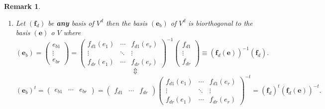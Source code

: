 \documentclass[aps,preprint]{revtex4}
\newtheorem{remark}[theorem]{Remark}
\begin{document}
\begin{remark}
\begin{enumerate}
\item Let $\left( \boldsymbol{f}_{d}\right) $ be \textbf{any} basis of $%
V^{d} $ then the basis $\left( \boldsymbol{e}_{b}\right) $ of $V^{d}$ is
biorthogonal to the basis $\left( \boldsymbol{e}\right) $ o $V$ where 
\begin{equation}
\left( \overset{}{\boldsymbol{e}_{b}}\right) =\left( 
\begin{array}{c}
e_{b1} \\ 
\vdots \\ 
e_{br}%
\end{array}%
\right) =\left( 
\begin{array}{ccc}
f_{d1}\left( e_{1}\right) & \cdots & f_{d1}\left( e_{r}\right) \\ 
\vdots & \ddots & \vdots \\ 
f_{dr}\left( e_{1}\right) & \cdots & f_{dr}\left( e_{r}\right)%
\end{array}%
\right) ^{-1}\left( 
\begin{array}{c}
f_{d1} \\ 
\vdots \\ 
f_{dr}%
\end{array}%
\right) \equiv \left( \overset{}{\boldsymbol{f}_{d}\left( \boldsymbol{e}%
\right) }\right) ^{-1}\left( \overset{}{\boldsymbol{f}_{d}}\right) .
\end{equation}%
\begin{equation}
\Updownarrow
\end{equation}%
\begin{equation}
\left( \overset{}{\boldsymbol{e}_{b}}\right) ^{t}=\left( 
\begin{array}{ccc}
e_{b1} & \cdots & e_{br}%
\end{array}%
\right) =\left( 
\begin{array}{ccc}
f_{d1} & \cdots & f_{dr}%
\end{array}%
\right) \left( 
\begin{array}{ccc}
f_{d1}\left( e_{1}\right) & \cdots & f_{d1}\left( e_{r}\right) \\ 
\vdots & \ddots & \vdots \\ 
f_{dr}\left( e_{1}\right) & \cdots & f_{dr}\left( e_{r}\right)%
\end{array}%
\right) ^{-t}=\left( \overset{}{\boldsymbol{f}_{d}}\right) ^{t}\left( 
\overset{}{\boldsymbol{f}_{d}\left( \boldsymbol{e}\right) }\right) ^{-t}.
\end{equation}


\end{enumerate}
\end{remark}
\end{document}
